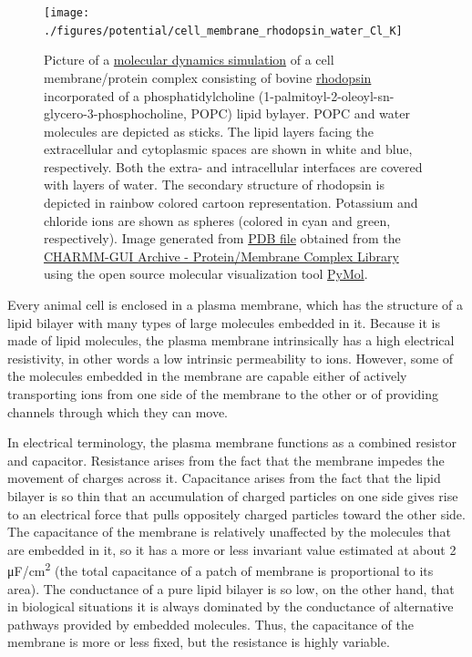 \begin{figure}

{\centering \texttt{[image: ./figures/potential/cell\_membrane\_rhodopsin\_water\_Cl\_K]} 

}

\caption{Picture of a \href{https://doi.org/10.1371/journal.pone.0000880}{molecular dynamics simulation} of a cell membrane/protein complex consisting of bovine \href{https://en.wikipedia.org/wiki/Rhodopsin}{rhodopsin} incorporated of a phosphatidylcholine (1-palmitoyl-2-oleoyl-sn-glycero-3-phosphocholine, POPC) lipid bylayer. POPC and water molecules are depicted as sticks. The lipid layers facing the extracellular and cytoplasmic spaces are shown in white and blue, respectively. Both the extra- and intracellular interfaces are covered with layers of water. The secondary structure of rhodopsin is depicted in rainbow colored cartoon representation. Potassium and chloride ions are shown as spheres (colored in cyan and green, respectively). Image generated from \href{http://www.charmm-gui.org/archive/complex/1gzm_rect_popc.pdb}{PDB file} obtained from the \href{http://www.charmm-gui.org/?doc=archive\&lib=complex}{CHARMM-GUI Archive - Protein/Membrane Complex Library} using the open source molecular visualization tool \href{https://pymol.org/2/}{PyMol}.}\label{fig:cellmembrane}
\end{figure}

Every animal cell is enclosed in a plasma membrane, which has the structure of a lipid bilayer with many types of large molecules embedded in it. Because it is made of lipid molecules, the plasma membrane intrinsically has a high electrical resistivity, in other words a low intrinsic permeability to ions. However, some of the molecules embedded in the membrane are capable either of actively transporting ions from one side of the membrane to the other or of providing channels through which they can move.

In electrical terminology, the plasma membrane functions as a combined resistor and capacitor. Resistance arises from the fact that the membrane impedes the movement of charges across it. Capacitance arises from the fact that the lipid bilayer is so thin that an accumulation of charged particles on one side gives rise to an electrical force that pulls oppositely charged particles toward the other side. The capacitance of the membrane is relatively unaffected by the molecules that are embedded in it, so it has a more or less invariant value estimated at about 2 μF/cm\textsuperscript{2} (the total capacitance of a patch of membrane is proportional to its area). The conductance of a pure lipid bilayer is so low, on the other hand, that in biological situations it is always dominated by the conductance of alternative pathways provided by embedded molecules. Thus, the capacitance of the membrane is more or less fixed, but the resistance is highly variable.

